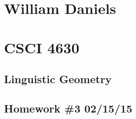 \documentclass[11pt]{article}
\begin{document}
\begin{center}
\section*{William Daniels}
\section*{CSCI 4630}
\subsection*{Linguistic Geometry}
\subsection*{Homework \#3 02/15/15}
\end{center}

\vspace{.25cm}
\end{document}
